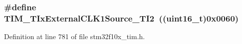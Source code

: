 \subsubsection[{\texorpdfstring{T\+I\+M\+\_\+\+T\+Ix\+External\+C\+L\+K1\+Source\+\_\+\+T\+I2}{TIM_TIxExternalCLK1Source_TI2}}]{\setlength{\rightskip}{0pt plus 5cm}\#define T\+I\+M\+\_\+\+T\+Ix\+External\+C\+L\+K1\+Source\+\_\+\+T\+I2~(({\bf uint16\+\_\+t})0x0060)}\hypertarget{group___t_i_m___t_ix___external___clock___source_gafa3c6345a7e1c3668b2e7e4d61a79491}{}\label{group___t_i_m___t_ix___external___clock___source_gafa3c6345a7e1c3668b2e7e4d61a79491}


Definition at line 781 of file stm32f10x\+\_\+tim.\+h.

